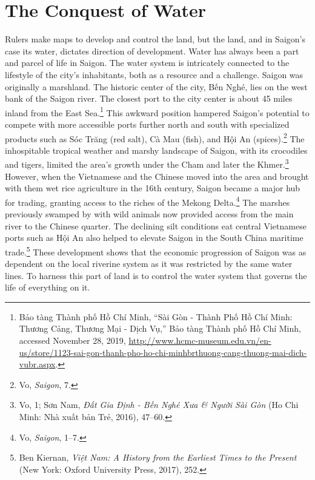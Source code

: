 \section{The Conquest of Water}
Rulers make maps to develop and control the land, but the land, and in Saigon’s case its water, dictates direction of development. Water has always been a part and parcel of life in Saigon. The water system is intricately connected to the lifestyle of the city’s inhabitants, both as a resource and a challenge. Saigon was originally a marshland. The historic center of the city, Bến Nghé, lies on the west bank of the Saigon river. The closest port to the city center is about 45 miles inland from the East Sea.\footnote{Bảo tàng Thành phố Hồ Chí Minh, “Sài Gòn - Thành Phố Hồ Chí Minh: Thương Cảng, Thương Mại - Dịch Vụ,” Bảo tàng Thành phố Hồ Chí Minh, accessed November 28, 2019, \url{http://www.hcmc-museum.edu.vn/en-us/store/1123-sai-gon-thanh-pho-ho-chi-minhbrthuong-cang-thuong-mai-dich-vubr.aspx}.} This awkward position hampered Saigon’s potential to compete with more accessible ports further north and south with specialized products such as Sóc Trăng (red salt), Cà Mau (fish), and Hội An (spices).\footnote{Vo, \textit{Saigon}, 7.} The inhospitable tropical weather and marshy landscape of Saigon, with its crocodiles and tigers, limited the area’s growth under the Cham and later the Khmer.\footnote{Vo, 1; Sơn Nam, \textit{Đất Gia Định - Bến Nghé Xưa \& Người Sài Gòn} (Ho Chi Minh: Nhà xuất bản Trẻ, 2016), 47–60.} However, when the Vietnamese and the Chinese moved into the area and brought with them wet rice agriculture in the 16th century, Saigon became a major hub for trading, granting access to the riches of the Mekong Delta.\footnote{Vo, \textit{Saigon}, 1–7.} The marshes previously swamped by with wild animals now provided access from the main river to the Chinese quarter. The declining silt conditions eat central Vietnamese ports such as Hội An also helped to elevate Saigon in the South China maritime trade.\footnote{Ben Kiernan, \textit{Việt Nam: A History from the Earliest Times to the Present} (New York: Oxford University Press, 2017), 252.}  These development shows that the economic progression of Saigon was as dependent on the local riverine system as it was restricted by the same water lines. To harness this part of land is to control the water system that governs the life of everything on it.

